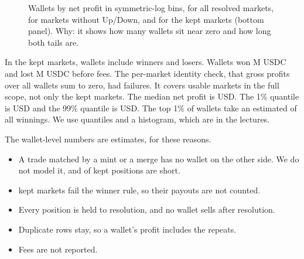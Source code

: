 \begin{figure}[H]
\centering
{}
\caption{Wallets by net profit in symmetric-log bins, for all resolved markets, for markets without Up/Down, and for the kept markets (bottom panel). Why: it shows how many wallets sit near zero and how long both tails are.}%
\label{fig:pnl-dist}
\end{figure}

In the kept markets, \PnlNWallets{} wallets include \PnlNWinners{} winners and \PnlNLosers{} losers.
Wallets won \PnlGrossWonM{} M USDC and lost \PnlGrossLostM{} M USDC before fees.
The per-market identity check, that gross profits over all wallets sum to zero, had \PnlNIdentityFailures{} failures.
It covers \PnlNMarketsChecked{} usable markets in the full scope, not only the kept markets.
The median net profit is \PnlMedianNet{} USD.
The 1\% quantile is \PnlQuantileOne{} USD and the 99\% quantile is \PnlQuantileNinetyNine{} USD.
The top 1\% of wallets take an estimated \PnlTopOnePctShareWon{} of all winnings.
We use quantiles and a histogram, which are in the lectures.

The wallet-level numbers are estimates, for these reasons.
\begin{itemize}
\item A trade matched by a mint or a merge has no wallet on the other side. We do not model it, and \PnlShareShortPositions{} of kept positions are short.
\item \PnlNKeptNotUsable{} kept markets fail the winner rule, so their payouts are not counted.
\item Every position is held to resolution, and no wallet sells after resolution.
\item Duplicate rows stay, so a wallet's profit includes the repeats.
\item Fees are not reported.
\end{itemize}


